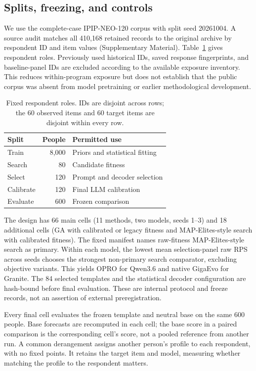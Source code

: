 \documentclass[sigconf,anonymous]{aamas}
\begin{document}
\subsection{Splits, freezing, and controls}
We use the complete-case IPIP-NEO-120 corpus with split seed 20261004.
A source audit matches all 410,168 retained records to the original archive
by respondent ID and item values (Supplementary Material). Table~\ref{tab:splits} gives respondent roles. Previously
used historical IDs, saved response fingerprints, and baseline-panel IDs are
excluded according to the available exposure inventory. This reduces
within-program exposure but does not establish that the public corpus was
absent from model pretraining or earlier methodological development.

\begin{table}[t]
\caption{Fixed respondent roles. IDs are disjoint across rows; the 60 observed
items and 60 target items are disjoint within every row.}
\label{tab:splits}\centering\small
\begin{tabular}{@{}lrl@{}}\toprule
Split & People & Permitted use\\\midrule
Train & 8,000 & Priors and statistical fitting\\
Search & 80 & Candidate fitness\\
Select & 120 & Prompt and decoder selection\\
Calibrate & 120 & Final LLM calibration\\
Evaluate & 600 & Frozen comparison\\\bottomrule
\end{tabular}
\end{table}

The design has 66 main cells (11 methods, two models, seeds 1--3) and 18
additional cells (GA with calibrated or legacy fitness and MAP-Elites-style
search with calibrated fitness). The fixed manifest names raw-fitness
MAP-Elites-style search as primary. Within each model, the lowest mean
selection-panel raw RPS across seeds chooses the strongest non-primary search
comparator, excluding objective variants. This yields OPRO for Qwen3.6 and
native GigaEvo for Granite. The 84 selected templates and the statistical
decoder configuration are hash-bound before final evaluation. These are
internal protocol and freeze records, not an assertion of external
preregistration.

Every final cell evaluates the frozen template and neutral base on the same
600 people. Base forecasts are recomputed in each cell; the base score in a
paired comparison is the corresponding cell's score, not a pooled reference
from another run. A common derangement assigns another person's profile to
each respondent, with no fixed points. It retains the target item and model,
measuring whether matching the profile to the respondent matters.
\end{document}
